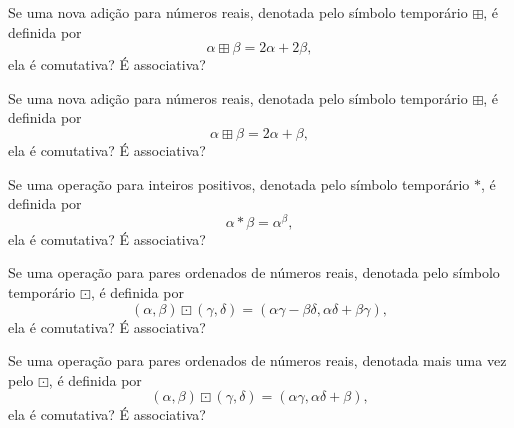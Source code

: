 \begin{exercise}
	Se uma nova adição para números reais, denotada pelo símbolo temporário $\boxplus$, é definida por
	$$
		\alpha \boxplus \beta = 2\alpha + 2\beta,
	$$
	ela é comutativa? É associativa?
\end{exercise}

\begin{exercise}
	Se uma nova adição para números reais, denotada pelo símbolo temporário $\boxplus$, é definida por
	$$
		\alpha \boxplus \beta = 2\alpha + \beta,
	$$
	ela é comutativa? É associativa?
\end{exercise}

\begin{exercise}
	Se uma operação para inteiros positivos, denotada pelo símbolo temporário $*$, é definida por
	$$
		\alpha * \beta = \alpha^{\beta},
	$$
	ela é comutativa? É associativa?
\end{exercise}

\begin{exercise}
	Se uma operação para pares ordenados de números reais, denotada pelo símbolo temporário $\boxdot$, é definida por
	$$
		(\alpha,\beta) \boxdot (\gamma, \delta) = (\alpha \gamma - \beta \delta, \alpha \delta + \beta \gamma),
	$$
	ela é comutativa? É associativa?
\end{exercise}

\begin{exercise}
	Se uma operação para pares ordenados de números reais, denotada mais uma vez pelo $\boxdot$, é definida por
	$$
		(\alpha,\beta) \boxdot (\gamma,\delta) = (\alpha \gamma, \alpha \delta + \beta),
	$$
	ela é comutativa? É associativa?
\end{exercise}
